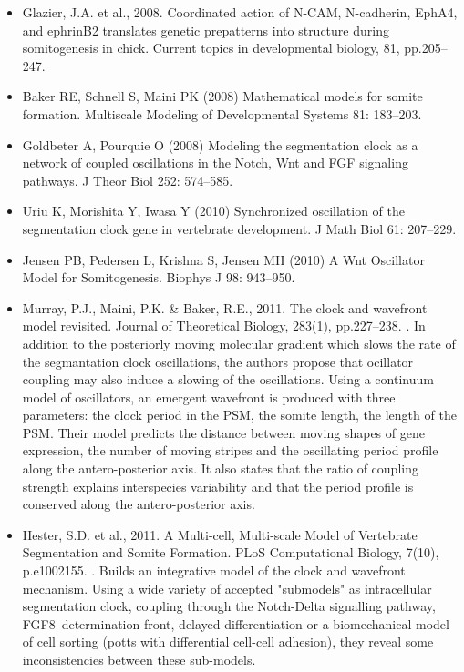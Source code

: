 \begin{itemize}
	\item    Glazier, J.A. et al., 2008. Coordinated action of N-CAM, N-cadherin, EphA4, and ephrinB2 translates genetic prepatterns into structure during somitogenesis in chick. Current topics in developmental biology, 81, pp.205–247. \cite{Glazier:2008kc}
	\item    Baker RE, Schnell S, Maini PK (2008) Mathematical models for somite formation. Multiscale Modeling of Developmental Systems 81: 183–203. \cite{Baker:2008hx}
	\item    Goldbeter A, Pourquie O (2008) Modeling the segmentation clock as a network of coupled oscillations in the Notch, Wnt and FGF signaling pathways. J Theor Biol 252: 574–585. \cite{Goldbeter:2008do}
	\item    Uriu K, Morishita Y, Iwasa Y (2010) Synchronized oscillation of the segmentation clock gene in vertebrate development. J Math Biol 61: 207–229. \cite{Uriu:2010kg}
	\item    Jensen PB, Pedersen L, Krishna S, Jensen MH (2010) A Wnt Oscillator Model for Somitogenesis. Biophys J 98: 943–950. \cite{Jensen:2010fy}
	\item    Murray, P.J., Maini, P.K. \& Baker, R.E., 2011. The clock and wavefront model revisited. Journal of Theoretical Biology, 283(1), pp.227–238. \cite{Murray:2011cy}. In addition to the posteriorly moving molecular gradient which slows the rate of the segmantation clock oscillations, the authors propose that ocillator coupling may also induce a slowing of the oscillations. Using a continuum model of oscillators, an emergent wavefront is produced with three parameters: the clock period in the PSM, the somite length, the length of the PSM. Their model predicts the distance between moving shapes of gene expression, the number of moving stripes and the oscillating period profile along the antero-posterior axis. It also states that the ratio of coupling strength explains interspecies variability and that the period profile is conserved along the antero-posterior axis.  
	\item    Hester, S.D. et al., 2011. A Multi-cell, Multi-scale Model of Vertebrate Segmentation and Somite Formation. PLoS Computational Biology, 7(10), p.e1002155. \cite{Hester:2011dc}. Builds an integrative model of the clock and wavefront mechanism. Using a wide variety of accepted "submodels" as intracellular segmentation clock, coupling through the Notch-Delta signalling pathway, FGF8 determination front, delayed differentiation or a biomechanical model of cell sorting (potts with differential cell-cell adhesion), they reveal some inconsistencies between these sub-models.   
\end{itemize}

